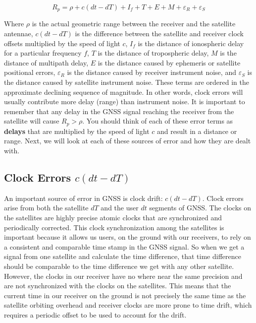 \documentclass[
]{book}
\begin{document}
\[
R_p=ρ+c(dt-dT)+I_f+T+E+M+ε_R+ε_S
\]

Where \(ρ\) is the actual geometric range between the receiver and the satellite antennae, \(c(dt-dT)\) is the difference between the satellite and receiver clock offsets multiplied by the speed of light \(c\), \(I_f\) is the distance of ionospheric delay for a particular frequency \(f\), \(T\) is the distance of tropospheric delay, \(M\) is the distance of multipath delay, \(E\) is the distance caused by ephemeris or satellite positional errors, \(ε_R\) is the distance caused by receiver instrument noise, and \(ε_S\) is the distance caused by satellite instrument noise. These terms are ordered in the approximate declining sequence of magnitude. In other words, clock errors will usually contribute more delay (range) than instrument noise. It is important to remember that any delay in the GNSS signal reaching the receiver from the satellite will cause \(R_p>ρ\). You should think of each of these error terms as \textbf{delays} that are multiplied by the speed of light \(c\) and result in a distance or range. Next, we will look at each of these sources of error and how they are dealt with.

\subsection{\texorpdfstring{Clock Errors \(c(dt-dT)\)}{Clock Errors c(dt-dT)}}\label{clock-errors-cdt-dt}

An important source of error in GNSS is clock drift: \(c(dt-dT)\). Clock errors arise from both the satellite \(dT\) and the user \(dt\) segments of GNSS. The clocks on the satellites are highly precise atomic clocks that are synchronized and periodically corrected. This clock synchronization among the satellites is important because it allows us users, on the ground with our receivers, to rely on a consistent and comparable time stamp in the GNSS signal. So when we get a signal from one satellite and calculate the time difference, that time difference should be comparable to the time difference we get with any other satellite. However, the clocks in our receiver have no where near the same precision and are not synchronized with the clocks on the satellites. This means that the current time in our receiver on the ground is not precisely the same time as the satellite orbiting overhead and receiver clocks are more prone to time drift, which requires a periodic offset to be used to account for the drift.
\end{document}
